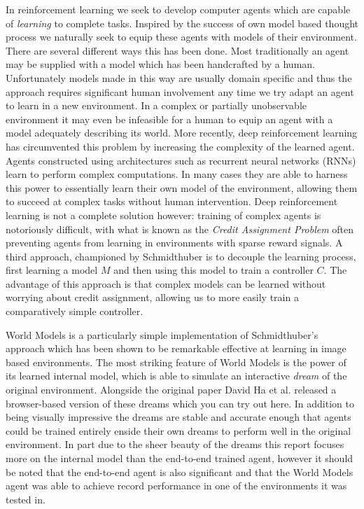 \documentclass{article}
\numberwithin{figure}{section}
\theoremstyle{definition}
\begin{document}
In reinforcement learning we seek to develop computer agents which are capable of \textit{learning} to complete tasks.
Inspired by the success of own model based thought process we naturally seek to equip these agents with models of their environment.
There are several different ways this has been done.
Most traditionally an agent may be supplied with a model which has been handcrafted by a human. %
Unfortunately models made in this way are usually domain specific and thus the approach requires significant human involvement any time we try adapt an agent to learn in a new environment.
In a complex or partially unobservable environment it may even be infeasible for a human to equip an agent with a model adequately describing its world. %
More recently, deep reinforcement learning has circumvented this problem by increasing the complexity of the learned agent.
Agents constructed using architectures such as recurrent neural networks (RNNs) learn to perform complex computations.
In many cases they are able to harness this power to essentially learn their own model of the environment, allowing them to succeed at complex tasks without human intervention.
Deep reinforcement learning is not a complete solution however: training of complex agents is notoriously difficult, with what is known as the \textit{Credit Assignment Problem} often preventing agents from learning in environments with sparse reward signals.
A third approach, championed by Schmidthuber is to decouple the learning process, first learning a model $M$ and then using this model to train a controller $C$. %
The advantage of this approach is that complex models can be learned without worrying about credit assignment, allowing us to more easily train a comparatively simple controller.

World Models is a particularly simple implementation of Schmidthuber's approach which has been shown to be remarkable effective at learning in image based environments. %
The most striking feature of World Models is the power of its learned internal model, which is able to simulate an interactive \textit{dream} of the original environment.
Alongside the original paper David Ha et al. released a browser-based version of these dreams which you can try out here. %
In addition to being visually impressive the dreams are stable and accurate enough that agents could be trained entirely enside their own dreams to perform well in the original environment.
In part due to the sheer beauty of the dreams this report focuses more on the internal model than the end-to-end trained agent, however it should be noted that the end-to-end agent is also significant and that the World Models agent was able to achieve record performance in one of the environments it was tested in.
\end{document}
